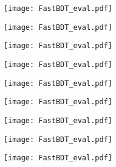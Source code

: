 \begin{figure}[H]
\begin{subfigure}{0.5\linewidth}
	\texttt{[image: FastBDT\_eval.pdf]}
\end{subfigure}
\begin{subfigure}{0.5\linewidth}
	\texttt{[image: FastBDT\_eval.pdf]}
\end{subfigure}
\begin{subfigure}{0.5\linewidth}
	\texttt{[image: FastBDT\_eval.pdf]}
\end{subfigure}
\begin{subfigure}{0.5\linewidth}
	\texttt{[image: FastBDT\_eval.pdf]}
\end{subfigure}
\begin{subfigure}{0.5\linewidth}
	\texttt{[image: FastBDT\_eval.pdf]}
\end{subfigure}
\begin{subfigure}{0.5\linewidth}
	\texttt{[image: FastBDT\_eval.pdf]}
\end{subfigure}
\begin{subfigure}{0.5\linewidth}
	\texttt{[image: FastBDT\_eval.pdf]}
\end{subfigure}
\begin{subfigure}{0.5\linewidth}
	\texttt{[image: FastBDT\_eval.pdf]}
\end{subfigure}
\begin{subfigure}{0.5\linewidth}
	\texttt{[image: FastBDT\_eval.pdf]}
\end{subfigure}
	
\end{figure}


\clearpage
\newpage
